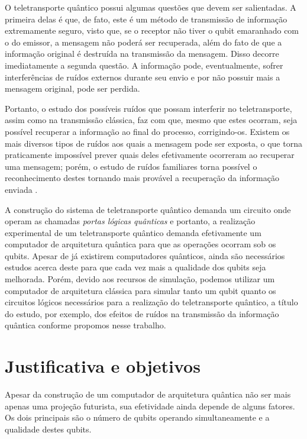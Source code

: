 \documentclass[12pt,oneside,brazil,hidelinks,article,sumario=tradicional,a4paper]{abntex2}
\begin{document}
O teletransporte quântico possui algumas questões que devem ser salientadas. A primeira delas é que, de fato, este é um método de transmissão de informação extremamente seguro, visto que, se o receptor não tiver o qubit emaranhado com o do emissor, a mensagem não poderá ser recuperada, além do fato de que a informação original é destruída na transmissão da mensagem. Disso decorre imediatamente a segunda questão. A informação pode, eventualmente, sofrer interferências de ruídos externos durante seu envio e por não possuir mais a mensagem original, pode ser perdida.

Portanto, o estudo dos possíveis ruídos que possam interferir no teletransporte, assim como na transmissão clássica, faz com que, mesmo que estes ocorram, seja possível recuperar a informação ao final do processo, corrigindo-os. Existem os mais diversos tipos de ruídos aos quais a mensagem pode ser exposta, o que torna praticamente impossível prever quais deles efetivamente ocorreram ao recuperar uma mensagem; porém, o estudo de ruídos familiares torna possível o reconhecimento destes tornando mais provável a recuperação da informação enviada \cite{fonzar}.

A construção do sistema de teletransporte quântico demanda um circuito onde operam as chamadas \textit{portas lógicas quânticas} e portanto, a realização experimental de um teletransporte quântico demanda efetivamente um computador de arquitetura quântica para que as operações ocorram sob os qubits. Apesar de já existirem computadores quânticos, ainda são necessários estudos acerca deste para que cada vez mais a qualidade dos qubits seja melhorada. Porém, devido aos recursos de simulação, podemos utilizar um computador de arquitetura clássica para simular tanto um qubit quanto os circuitos lógicos necessários para a realização do teletransporte quântico, a título do estudo, por exemplo, dos efeitos de ruídos na transmissão da informação quântica conforme propomos nesse trabalho.

\section{Justificativa e objetivos}\label{sec:just}

Apesar da construção de um computador de arquitetura quântica não ser mais apenas uma projeção futurista, sua efetividade ainda depende de alguns fatores. Os dois principais são o número de qubits operando simultaneamente e a qualidade destes qubits.
\end{document}
